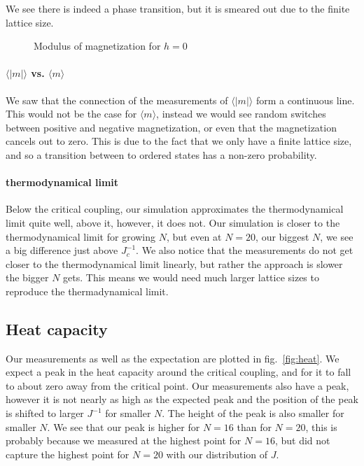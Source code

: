 \documentclass{scrartcl}
\begin{document}
We see there is indeed a phase transition, but it is smeared out due to the finite lattice size.
	\begin{figure}[htbp]
		
		\caption{Modulus of magnetization for $h=0$}
		\label{fig:absmag}
	\end{figure}


\paragraph{$\langle |m|\rangle$ vs. $\langle m\rangle$}
We saw that the connection of the measurements of $\langle |m|\rangle$ form a continuous line. This would not be the case for $\langle m\rangle$, instead we would see random switches between positive and negative magnetization, or even that the magnetization cancels out to zero. This is due to the fact that we only have a finite lattice size, and so a transition between to ordered states has a non-zero probability.

\paragraph{thermodynamical limit}

Below the critical coupling, our simulation approximates the thermodynamical limit quite well, above it, however, it does not. Our simulation is closer to the thermodynamical limit for growing $N$, but even at $N=20$, our biggest $N$, we see a big difference just above $J_c^{-1}$. We also notice that the measurements do not get closer to the thermodynamical limit linearly, but rather the approach is slower the bigger $N$ gets. This means we would need much larger lattice sizes to reproduce the thermadynamical limit.

\subsection{Heat capacity}

Our measurements as well as the expectation are plotted in fig.~\ref{fig:heat}. We expect a peak in the heat capacity around the critical coupling, and for it to fall to about zero away from the critical point. Our measurements also have a peak, however it is not nearly as high as the expected peak and the position of the peak is shifted to larger $J^{-1}$ for smaller $N$. The height of the peak is also smaller for smaller $N$. We see that our peak is higher for $N=16$ than for $N=20$, this is probably because we measured at the highest point for $N=16$, but did not capture the highest point for $N=20$ with our distribution of $J$.
\end{document}
